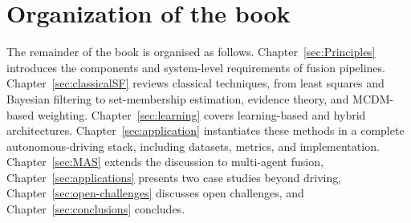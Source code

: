 \section{Organization of the book}

The remainder of the book is organised as follows. Chapter~\ref{sec:Principles} introduces the components and system-level requirements of fusion pipelines. Chapter~\ref{sec:classicalSF} reviews classical techniques, from least squares and Bayesian filtering to set-membership estimation, evidence theory, and MCDM-based weighting. Chapter~\ref{sec:learning} covers learning-based and hybrid architectures. Chapter~\ref{sec:application} instantiates these methods in a complete autonomous-driving stack, including datasets, metrics, and implementation. Chapter~\ref{sec:MAS} extends the discussion to multi-agent fusion, Chapter~\ref{sec:applications} presents two case studies beyond driving, Chapter~\ref{sec:open-challenges} discusses open challenges, and Chapter~\ref{sec:conclusions} concludes.

%
%

